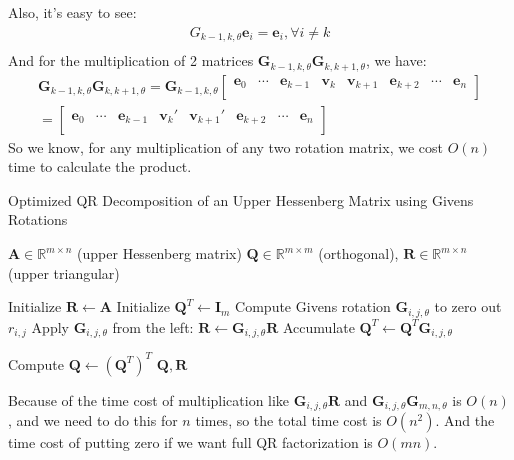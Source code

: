 \documentclass{article}
\begin{document}
Also, it's easy to see:
\begin{align*}
    G_{k - 1, k, \theta}\bm{e}_{i} = \bm{e}_{i}, \forall i \neq k  \\
\end{align*}
And for the multiplication of 2 matrices \(\bm{G}_{k-1, k, \theta}\bm{G}_{k, k+1, \theta}\), we have:
\begin{align*}
    \bm{G}_{k-1, k, \theta}\bm{G}_{k, k+1, \theta} = \bm{G}_{k-1, k, \theta} \begin{bmatrix}
        \bm{e}_0 & \cdots &\bm{e}_{k - 1} &\bm{v}_{k} &\bm{v}_{k+1} &\bm{e}_{k+2} &\cdots & \bm{e}_n \\
    \end{bmatrix}\\
    = \begin{bmatrix}
        \bm{e}_0 & \cdots &\bm{e}_{k - 1} &\bm{v}_{k}'  & \bm{v}_{k+1}'&\bm{e}_{k+2} &\cdots & \bm{e}_n \\
    \end{bmatrix}
\end{align*}
So we know, for any multiplication of any two rotation matrix, we cost \(O(n)\) time to calculate the product.

\begin{algorithm}
\caption{Optimized QR Decomposition of an Upper Hessenberg Matrix using Givens Rotations}
\label{alg:qr_hessenberg}
\begin{algorithmic}[1]
\Require $\bm{A} \in \mathbb{R}^{m \times n}$ (upper Hessenberg matrix)
\Ensure $\bm{Q} \in \mathbb{R}^{m \times m}$ (orthogonal), $\bm{R} \in \mathbb{R}^{m \times n}$ (upper triangular)

\State Initialize $\bm{R} \gets \bm{A}$
\State Initialize $\bm{Q}^T \gets \bm{I}_m$
            \State Compute Givens rotation $\bm{G}_{i,j,\theta}$ to zero out $r_{i,j}$
            \State Apply $\bm{G}_{i,j,\theta}$ from the left: $\bm{R} \gets \bm{G}_{i,j,\theta} \bm{R}$
            \State Accumulate $\bm{Q}^T \gets \bm{Q}^T \bm{G}_{i,j,\theta}$
        \EndIf
    \EndFor
\EndFor

\State Compute $\bm{Q} \gets (\bm{Q}^T)^T$
\State \Return $\bm{Q}, \bm{R}$
\end{algorithmic}
\end{algorithm}

Because of the time cost of multiplication like \(\bm{G}_{i,j,\theta}\bm{R}\) and \(\bm{G}_{i,j,\theta} \bm{G}_{m, n, \theta}\) is \(O(n)\), and we need to do this for \(n\) times, so the total time cost is \(O(n^2)\). And the time cost of putting zero if we want full QR factorization is \(O(mn)\).
\end{document}

